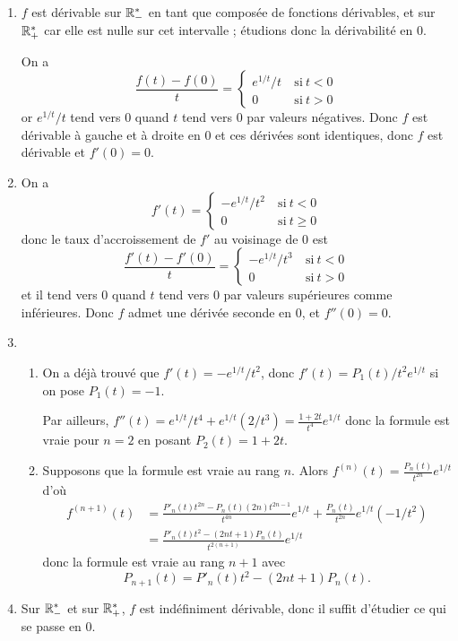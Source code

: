 \documentclass[11pt,a4paper]{article}
\begin{document}
\begin{enumerate}
\item $f$ est d\'erivable sur $\mathbb{R}_-^*$ en tant que compos\'ee de fonctions
  d\'erivables, et sur $\mathbb{R}_+^*$ car elle est nulle sur cet intervalle ; \'etudions donc la
  d\'erivabilit\'e en $0$.

On a
$$\frac{f(t)-f(0)}{t}=\begin{cases}
  e^{1/t}/t & \mathrm{\ si\ } t<0\\
0  & \mathrm{\ si\ } t > 0
\end{cases}$$
or $e^{1/t}/t$ tend vers $0$ quand $t$ tend vers $0$ par valeurs
n\'egatives. Donc $f$ est d\'erivable \`a gauche et \`a droite en 0 et ces
d\'eriv\'ees sont identiques, donc $f$ est d\'erivable et $f'(0)=0$.
\item On a
$$f'(t)=\begin{cases}
  -e^{1/t}/t^2 & \mathrm{\ si\ } t<0\\
0  & \mathrm{\ si\ } t \geq 0
\end{cases}$$
donc le taux d'accroissement de $f'$ au voisinage de 0 est
$$\frac{f'(t)-f'(0)}{t}=\begin{cases}
  -e^{1/t}/t^3& \mathrm{\ si\ } t<0\\
0  & \mathrm{\ si\ } t > 0
\end{cases}$$
et il tend vers $0$ quand $t$ tend vers $0$ par valeurs sup\'erieures
comme inf\'erieures. Donc $f$ admet une d\'eriv\'ee seconde en $0$, et
$f''(0)=0$.

\item
  \begin{enumerate}
  \item On a d\'ej\`a trouv\'e que $f'(t)=-e^{1/t}/t^2$, donc  $f'(t)=P_1(t)/t^2
    e^{1/t}$ si on pose $P_1(t)=-1$.

Par ailleurs, $f''(t)=e^{1/t}/t^4+e^{1/t}
(2/t^3)=\frac{1+2t}{t^4}e^{1/t}$ donc la formule est vraie pour
$n=2$ en posant $P_2(t)=1+2t$.
\item Supposons que la formule est vraie au rang $n$.
Alors $f^{(n)}(t)=\frac{P_n(t)}{t^{2n}}e^{1/t}$ d'o\`u
\begin{equation*}
\begin{split}
  f^{(n+1)}(t)&=\frac{P'_n(t)t^{2n}-P_n(t)(2n)t^{2n-1}}{t^{4n}}e^{1/t}+\frac{P_n(t)}{t^{2n}}e^{1/t}(-1/t^2)\\
&= \frac{P'_n(t)t^{2}-(2n t+1) P_n(t)}{t^{2(n+1)}}e^{1/t}
\end{split}
\end{equation*}
donc la formule est vraie au rang $n+1$ avec
$$P_{n+1}(t)=P'_n(t)t^{2}-(2n t+1) P_n(t).$$
  \end{enumerate}
\item Sur $\mathbb{R}_-^*$ et sur $\mathbb{R}_+^*$, $f$ est ind\'efiniment d\'erivable, donc il
  suffit d'\'etudier ce qui se passe en $0$.


\end{enumerate}
\end{document}
